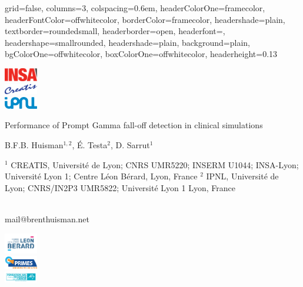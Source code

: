 \documentclass[portrait,a0paper,fontscale=0.29]{baposter}
\begin{document}
\begin{poster}{
 grid=false,
 columns=3,
 colspacing=0.6em,
 headerColorOne=framecolor,
 headerFontColor=offwhitecolor,
 borderColor=framecolor,
 headershade=plain,
 textborder=roundedsmall,
 headerborder=open,
 headerfont=\Large\textsc,
 headershape=smallrounded,
 headershade=plain,
 background=plain,
 bgColorOne=offwhitecolor,
 boxColorOne=offwhitecolor,
 headerheight=0.13\textheight}
 { \parbox[c]{0.11\textwidth}{\includegraphics[width=0.11\textwidth]{logo/insa} \\\includegraphics[width=0.11\textwidth]{logo/creatis} \\ \includegraphics[width=0.11\textwidth]{logo/ipnl}}
 }
 {\Huge Performance of Prompt Gamma fall-off detection in clinical simulations}
 {
 \vspace{0.2cm}
 B.F.B. Huisman$^{1,2}$, É. Testa$^2$, D. Sarrut$^1$\\
 \begin{small}
 $^1$ CREATIS, Université de Lyon; CNRS UMR5220; INSERM U1044; INSA-Lyon;
\vspace{-0.2cm}
Université Lyon 1; Centre Léon Bérard, Lyon, France
 $^2$ IPNL, Université de Lyon; CNRS/IN2P3 UMR5822; Université Lyon 1 Lyon, France
 \end{small}\vspace{0.2cm}\\
 mail@brenthuisman.net
 }
 { \parbox[c]{0.11\textwidth}{\includegraphics[width=0.11\textwidth]{logo/clb} \\       \includegraphics[width=0.11\textwidth]{logo/labexprimes} \\ \includegraphics[width=0.11\textwidth]{logo/arclogo}}
 }
 

\end{poster}
\end{document}
